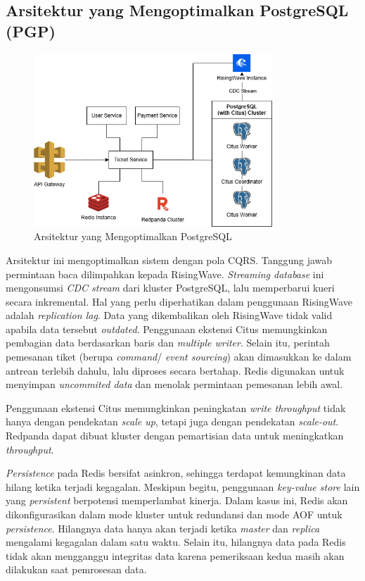\subsection{Arsitektur yang Mengoptimalkan PostgreSQL (PGP)}

\begin{figure}[htbp]
    \centering
    \includegraphics[width=0.8\textwidth]{resources/appendix/architecture-optimized.png}
    \caption{Arsitektur yang Mengoptimalkan PostgreSQL}
    \label{fig:optimized-architecture}
\end{figure}

Arsitektur ini mengoptimalkan sistem dengan pola CQRS. Tanggung jawab permintaan baca dilimpahkan kepada RisingWave. \textit{Streaming database} ini mengonsumsi \textit{CDC stream} dari kluster PostgreSQL, lalu memperbarui kueri secara inkremental. Hal yang perlu diperhatikan dalam penggunaan RisingWave adalah \textit{replication lag}. Data yang dikembalikan oleh RisingWave tidak valid apabila data tersebut \textit{outdated}. Penggunaan ekstensi Citus memungkinkan pembagian data berdasarkan baris dan \textit{multiple writer}. Selain itu, perintah pemesanan tiket (berupa \textit{command}/ \textit{event sourcing}) akan dimasukkan ke dalam antrean terlebih dahulu, lalu diproses secara bertahap. Redis digunakan untuk menyimpan \textit{uncommited data} dan menolak permintaan pemesanan lebih awal.

Penggunaan ekstensi Citus memungkinkan peningkatan \textit{write throughput} tidak hanya dengan pendekatan \textit{scale up}, tetapi juga dengan pendekatan \textit{scale-out}. Redpanda dapat dibuat kluster dengan pemartisian data untuk meningkatkan \textit{throughput}.

\textit{Persistence} pada Redis bersifat asinkron, sehingga terdapat kemungkinan data hilang ketika terjadi kegagalan. Meskipun begitu, penggunaan \textit{key-value store} lain yang \textit{persistent} berpotensi memperlambat kinerja. Dalam kasus ini, Redis akan dikonfigurasikan dalam mode kluster untuk redundansi dan mode AOF untuk \textit{persistence}. Hilangnya data hanya akan terjadi ketika \textit{master} dan \textit{replica} mengalami kegagalan dalam satu waktu. Selain itu, hilangnya data pada Redis tidak akan mengganggu integritas data karena pemeriksaan kedua masih akan dilakukan saat pemrosesan data.

